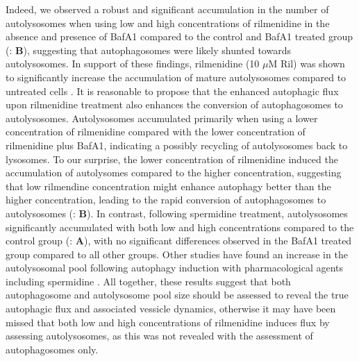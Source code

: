 Indeed, we observed a robust and significant accumulation in the number of autolysosomes when using low and high concentrations of rilmenidine in the absence and presence of BafA1 compared to the control and BafA1 treated group (: \textbf{B}), suggesting that autophagosomes were likely shunted towards autolysosomes. In support of these findings,  rilmenidine (10 $\mu$M Ril) was shown to significantly increase the accumulation of mature autolysosomes compared to untreated cells \citep{Perera2018}. It is reasonable to propose that the enhanced autophagic flux upon rilmenidine treatment  also enhances the conversion of autophagosomes to autolysosomes. Autolysosomes accumulated primarily when using a lower concentration of rilmenidine compared with the lower concentration of rilmenidine plus BafA1, indicating a possibly recycling of autolysosomes back to lysosomes. To our surprise, the lower concentration of rilmenidine induced the accumulation of autolysomes compared to the higher concentration, suggesting that low rilmendine concentration might enhance autophagy better than the higher concentration, leading to the rapid conversion of autophagosomes to autolysosomes (: \textbf{B}). In contrast, following spermidine treatment, autolysosomes significantly accumulated with both low and high concentrations compared to the control group (: \textbf{A}), with no significant differences observed in the BafA1 treated group compared to all other groups. Other studies have found an increase in the autolysosomal pool following autophagy induction with pharmacological agents including spermidine \citep{DuToit2018a}. All together, these results suggest that both autophagosome and autolysosome pool size should be assessed to reveal the true autophagic flux and associated vessicle dynamics, otherwise it may have been missed that both low and high concentrations of rilmenidine induces flux by assessing autolysosomes, as this was not revealed with the assessment of autophagosomes only. 


